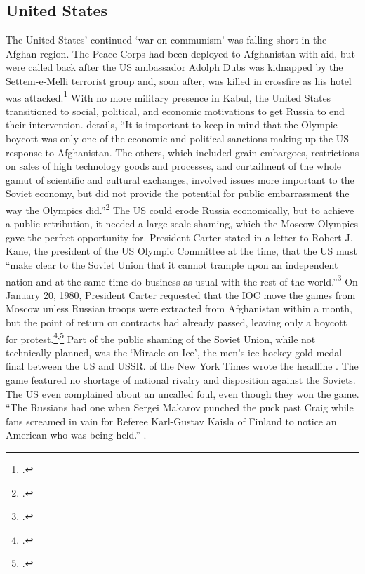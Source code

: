 \documentclass[12pt,letterpaper]{article}
\begin{document}
\subsection{United States}
The United States' continued `war on communism' was falling short in the Afghan region. The Peace Corps had been deployed to Afghanistan with aid, but were called back after the US ambassador Adolph Dubs was kidnapped by the Settem-e-Melli terrorist group and, soon after, was killed in crossfire as his hotel was attacked.\footcite[29]{urban_war_1990} With no more military presence in Kabul, the United States transitioned to social, political, and economic motivations to get Russia to end their intervention. \citeauthor{kanin_olympic_1980} details, ``It is important to keep in mind that the Olympic boycott was only one of the economic and political sanctions making up the US response to Afghanistan. The others, which included grain embargoes, restrictions on sales of high technology goods and processes, and curtailment of the whole gamut of scientific and cultural exchanges, involved issues more important to the Soviet economy, but did not provide the potential for public embarrassment the way the Olympics did.''\footcite[6]{kanin_olympic_1980} The US could erode Russia economically, but to achieve a public retribution, it needed a large scale shaming, which the Moscow Olympics gave the perfect opportunity for. President Carter stated in a letter to Robert J. Kane, the president of the US Olympic Committee at the time, that the US must ``make clear to the Soviet Union that it cannot trample upon an independent nation and at the same time do business as usual with the rest of the world.''\footcite{smith_president_1980} On January 20, 1980, President Carter requested that the IOC move the games from Moscow unless Russian troops were extracted from Afghanistan within a month, but the point of return on contracts had already passed, leaving only a boycott for protest.\footcite[7]{kanin_olympic_1980}\textsuperscript{,}\footcite{smith_president_1980} Part of the public shaming of the Soviet Union, while not technically planned, was the `Miracle on Ice', the men's ice hockey gold medal final between the US and USSR. \citeauthor{eskenazi_u.s._1980} of the New York Times wrote the headline . The game featured no shortage of national rivalry and disposition against the Soviets. The US even complained about an uncalled foul, even though they won the game. ``The Russians had one when Sergei Makarov punched the puck past Craig while fans screamed in vain for Referee Karl-Gustav Kaisla of Finland to notice an American who was being held.'' \citeauthor{eskenazi_u.s._1980}. 
\end{document}

